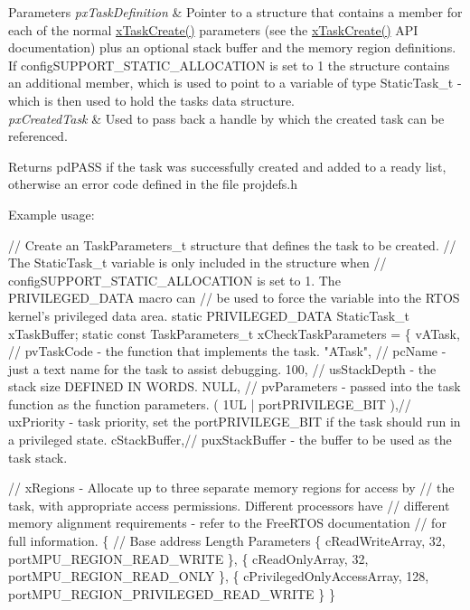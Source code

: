 \begin{DoxyParams}{Parameters}
{\em px\+Task\+Definition} & Pointer to a structure that contains a member for each of the normal \hyperlink{vendor_2ceedling_2plugins_2freertos_2src_2freertos_2include_2task_8h_adf67e7cd0bfd1eda9e8afd048206f7c2}{x\+Task\+Create()} parameters (see the \hyperlink{vendor_2ceedling_2plugins_2freertos_2src_2freertos_2include_2task_8h_adf67e7cd0bfd1eda9e8afd048206f7c2}{x\+Task\+Create()} A\+PI documentation) plus an optional stack buffer and the memory region definitions. If config\+S\+U\+P\+P\+O\+R\+T\+\_\+\+S\+T\+A\+T\+I\+C\+\_\+\+A\+L\+L\+O\+C\+A\+T\+I\+ON is set to 1 the structure contains an additional member, which is used to point to a variable of type Static\+Task\+\_\+t -\/ which is then used to hold the task\textquotesingle{}s data structure.\\
\hline
{\em px\+Created\+Task} & Used to pass back a handle by which the created task can be referenced.\\
\hline
\end{DoxyParams}
\begin{DoxyReturn}{Returns}
pd\+P\+A\+SS if the task was successfully created and added to a ready list, otherwise an error code defined in the file projdefs.\+h
\end{DoxyReturn}
Example usage\+: 
\begin{DoxyPre}
// Create an TaskParameters\_t structure that defines the task to be created.
// The StaticTask\_t variable is only included in the structure when
// configSUPPORT\_STATIC\_ALLOCATION is set to 1.  The PRIVILEGED\_DATA macro can
// be used to force the variable into the RTOS kernel's privileged data area.
static PRIVILEGED\_DATA StaticTask\_t xTaskBuffer;
static const TaskParameters\_t xCheckTaskParameters =
\{
 vATask,     // pvTaskCode - the function that implements the task.
 "ATask",    // pcName - just a text name for the task to assist debugging.
 100,        // usStackDepth - the stack size DEFINED IN WORDS.
 NULL,       // pvParameters - passed into the task function as the function parameters.
 ( 1UL | portPRIVILEGE\_BIT ),// uxPriority - task priority, set the portPRIVILEGE\_BIT if the task should run in a privileged state.
 cStackBuffer,// puxStackBuffer - the buffer to be used as the task stack.\end{DoxyPre}



\begin{DoxyPre} // xRegions - Allocate up to three separate memory regions for access by
 // the task, with appropriate access permissions.  Different processors have
 // different memory alignment requirements - refer to the FreeRTOS documentation
 // for full information.
 \{
     // Base address                 Length  Parameters
     \{ cReadWriteArray,              32,     portMPU\_REGION\_READ\_WRITE \},
     \{ cReadOnlyArray,               32,     portMPU\_REGION\_READ\_ONLY \},
     \{ cPrivilegedOnlyAccessArray,   128,    portMPU\_REGION\_PRIVILEGED\_READ\_WRITE \}
 \}\end{DoxyPre}



